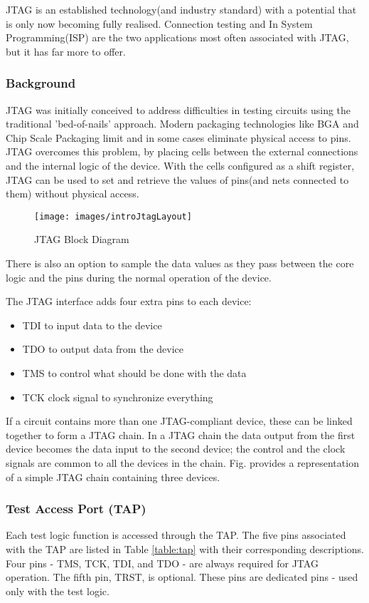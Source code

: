 \documentclass[a4paper,11pt]{article}
\begin{document}
JTAG is an established technology(and industry standard) with a potential that is only now becoming fully realised. Connection testing and In System Programming(ISP) are the two applications most often associated with JTAG, but it has far more to offer.
\subsubsection{Background}
JTAG was initially conceived to address difficulties in testing circuits using the traditional 'bed-of-nails' approach. Modern packaging technologies like BGA and Chip Scale Packaging limit and in some cases eliminate physical access to pins.
JTAG overcomes this problem, by placing cells between the external connections and the internal logic of the device. With the cells configured as a shift register, JTAG can be used to set and retrieve the values of pins(and nets connected to them) without physical access.\cite{xjtag}

\begin{figure}[ht]
\centering
\texttt{[image: images/introJtagLayout]}
\caption{JTAG Block Diagram \cite{xjtag2}}
\end{figure}

There is also an option to sample the data values as they pass between the core logic and the pins during the normal operation of the device.

The JTAG interface adds four extra pins to each device:
\begin{itemize}[noitemsep]
\item TDI to input data to the device
\item TDO to output data from the device
\item TMS to control what should be done with the data
\item TCK clock signal to synchronize everything
\end{itemize}

If a circuit contains more than one JTAG-compliant device, these can be linked together to form a JTAG chain. In a JTAG chain the data output from the first device becomes the data input to the second device; the control and the clock signals are common to all the devices in the chain. Fig. provides a representation of a simple JTAG chain containing three devices.\cite{xjtag}


\subsubsection{Test Access Port (TAP)}
Each test logic function is accessed through the TAP. The five pins associated with the TAP are listed in Table \ref{table:tap} with their corresponding descriptions. Four pins - TMS, TCK, TDI, and TDO - are always required for JTAG operation. The fifth pin, TRST, is optional. These pins are dedicated pins - used only with the test logic.\cite{microsemi}
\end{document}

